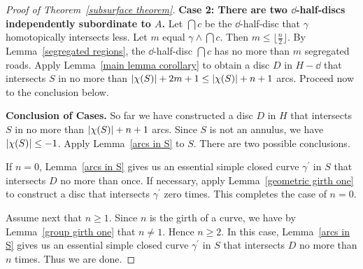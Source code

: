 \begin{proof}[Proof of Theorem~\ref{subsurface theorem}]
\textbf{Case 2:  There are two $\dd$-half-discs independently subordinate
to $A$.}  Let $\dint{c}$ be the $\dd$-half-disc that $\gamma$ homotopically 
intersects less.  Let $m$ equal $\gamma\wedge\dint{c}$.  Then $m\leq\lfloor\frac{n}{2}\rfloor$.  By Lemma~\ref{segregated regions}, the $\dd$-half-disc $\dint{c}$ has no more than $m$ segregated roads.
Apply Lemma~\ref{main lemma corollary} to obtain a disc $D$ in $H-\dd$
that intersects $S$ in no more than $| \chi (S) |+2m+1\leq| \chi (S) |+n+1$ arcs.
Proceed now to the conclusion below.

\textbf{Conclusion of Cases.}
So far we have constructed a disc $D$ in $H$ that intersects $S$ in no more than $| \chi (S) |+n+1$ arcs.  Since $S$ is not an annulus, we have $| \chi (S) |\leq-1$.  Apply Lemma~\ref{arcs in S} to $S$.  There are two possible conclusions.

If $n=0$, Lemma~\ref{arcs in S} gives us an essential simple closed curve $\gamma^{\prime}$ in $S$ that intersects $D$ no more than once.  If necessary, apply Lemma~\ref{geometric girth one} to construct a disc that intersects $\gamma^\prime$ zero times.  This completes the case of $n=0$.

Assume next that $n\geq1$.  Since $n$ is the girth of a curve, we have by Lemma~\ref{group girth one} that $n\neq1$.  Hence $n\geq2$.  In this case, Lemma~\ref{arcs in S} gives us an essential simple closed curve $\gamma^{\prime}$ in $S$ that intersects $D$ no more than $n$ times.  Thus we are done.
\end{proof}

